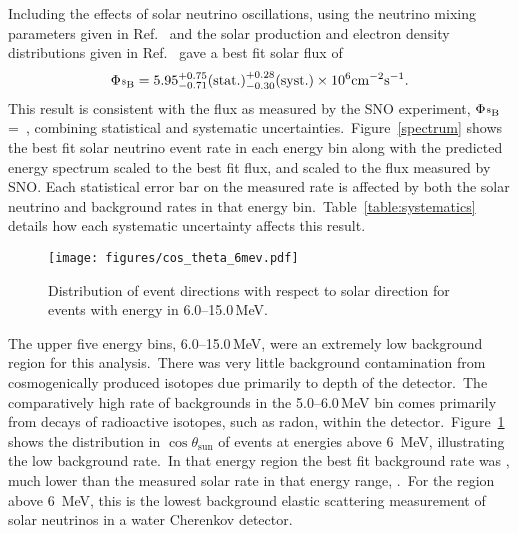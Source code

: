 Including the effects of solar neutrino oscillations, using the neutrino mixing
parameters given in Ref.~\cite{pdg2016} and the solar production and electron
density distributions given in Ref.~\cite{bs05op} gave a best fit solar flux
of
\begin{equation*}
    \Phi_{\ce{^{8}B}}= 5.95^{+0.75}_{-0.71}\text{(stat.)}^{+0.28}_{-0.30}\text{(syst.)}\times10^{6}\text{cm}^{-2}\text{s}^{-1}\text{.}
\end{equation*}
This result is consistent with the \beight flux as measured by the SNO experiment,
$\Phi_{\ce{^{8}B}}$=\fluxunits{\SNOFlux}~\cite{sno_combined}, combining statistical
and systematic uncertainties.\
Figure~\ref{spectrum} shows the best fit solar neutrino \beight event rate in each
energy bin along with the predicted energy spectrum scaled to the best fit
flux, and scaled to the flux measured by SNO. Each statistical error bar on the
measured rate is affected by both the solar neutrino and background rates in that
energy bin.\
Table~\ref{table:systematics} details how each systematic uncertainty affects this result.\

\begin{figure}[htbp]
    \centering
\texttt{[image: figures/cos\_theta\_6mev.pdf]}%
\caption{Distribution of event directions with respect to solar direction for
    events with energy in \numrange[range-phrase=--]{6.0}{15.0}\,MeV.}
\label{fig:cos_theta_six}
\end{figure}

The upper five energy bins, \numrange[range-phrase=--]{6.0}{15.0}\,MeV, were an
extremely low background region for this analysis.\
There was very little background contamination from
cosmogenically produced isotopes due primarily to depth of the detector.\
The comparatively high rate of backgrounds in the \numrange[range-phrase=--]{5.0}{6.0}\,MeV bin
comes primarily from decays of radioactive isotopes, such as radon, within the detector.\
Figure~\ref{fig:cos_theta_six} shows the distribution in $\cos\theta_\text{{sun}}$ of events at
energies above 6~MeV, illustrating the low background rate.\
In that energy region the best fit background rate was \LowBackgroundRate, much
lower than the measured solar rate in that energy range, \HighEnergySolarRate.\
For the region above 6~MeV, this is the lowest
background elastic scattering measurement of solar neutrinos in a water
Cherenkov detector.\
